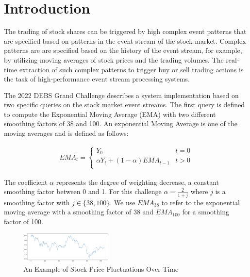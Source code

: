 
\section{Introduction}
The trading of stock shares can be triggered by high complex event patterns that are specified
based on patterns in the event stream of the stock market. Complex patterns are are specified based on the history of 
the event stream, for example, by utilizing moving averages of stock prices and the trading volumes.
The real-time extraction of such complex patterns to trigger buy or sell trading actions is the task
of high-performance event stream processing systems.

The 2022 DEBS Grand Challenge \cite{debs2022challenge} describes a system implementation based on two specific queries on the
stock market event streams. The first query is defined to compute the Exponential Moving Average (EMA) with two different smoothing factors of 38 and 100.
An exponential Moving Average is one of the moving averages and is defined as follows:

\begin{align*}
    EMA_t = \begin{cases}
        Y_0 &  t = 0 \\
        \alpha Y_t + (1-\alpha) EMA_{t-1}& t>0 \\
        \end{cases}
\end{align*}

The coefficient $\alpha$ represents the degree of weighting decrease, a constant smoothing factor between 0 and 1.
For this challenge $\alpha = \frac{2}{1+j}$ where $j$ is a smoothing factor with $j \in \{38, 100 \}$.
We use $EMA_{38}$ to refer to the exponential moving average with a smoothing factor of 38 and $EMA_{100}$ for a smoothing factor of 100.


\begin{figure}[!ht]
    \begin{center}
        \includegraphics[width=0.42\textwidth]{./images/stock_example.png}
        \caption{An Example of Stock Price Fluctuations Over Time}
        \label{fig:stock}
    \end{center}
\end{figure}



